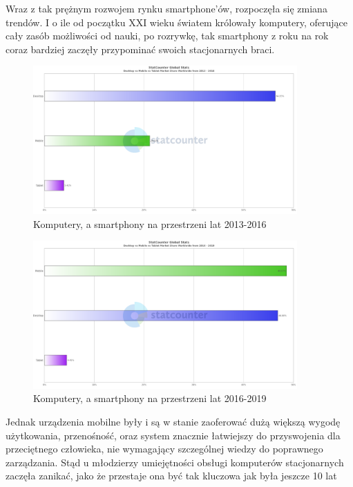 \documentclass[12pt, a4paper]{article}
\begin{document}
\begin{sloppypar}
{{    Wraz z tak prężnym rozwojem rynku smartphone'ów, rozpoczęła się zmiana trendów.
    I o ile od początku XXI wieku światem królowały komputery, oferujące cały zasób 
    możliwości od nauki, po rozrywkę, tak smartphony z roku na rok coraz bardziej 
    zaczęły przypominać swoich stacjonarnych braci. 
    \begin{figure}[H]
      \centering
      \includegraphics[width=0.9\textwidth]{systems_chart1.png}
      \caption{Komputery, a smartphony na przestrzeni lat 2013-2016}
      \label{fig:2013}
    \end{figure} 
    \begin{figure}[H]
      \centering
      \includegraphics[width=0.9\textwidth]{systems_chart2.png}
      \caption{Komputery, a smartphony na przestrzeni lat 2016-2019}
      \label{fig:2016}
    \end{figure} 
    Jednak urządzenia mobilne były i są w stanie zaoferować dużą większą wygodę 
    użytkowania, przenośność, oraz system znacznie łatwiejszy do przyswojenia dla 
    przeciętnego człowieka, nie wymagający szczególnej wiedzy do poprawnego
    zarządzania. Stąd u młodzierzy umiejętności obsługi komputerów stacjonarnych
    zaczęła zanikać, jako że przestaje ona być tak kluczowa jak była jeszcze 10 lat
}}
\end{sloppypar}
\end{document}
